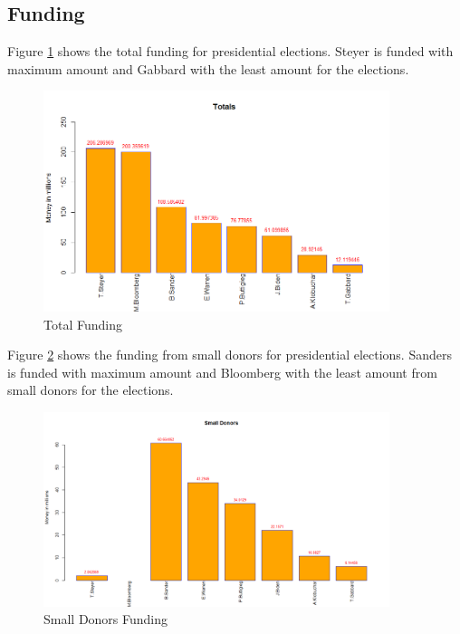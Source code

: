 \subsection{Funding}
Figure \ref{Total} shows the total funding for presidential elections. Steyer is funded with maximum amount and Gabbard with the least amount for the elections. 
\begin{figure}[H]
    \centering
    \includegraphics[width=0.9\textwidth]{figures/Total.png}
    \caption{Total Funding}
    \label{Total}
\end{figure}

Figure \ref{Small Donors} shows the funding from small donors for presidential elections. Sanders is funded with maximum amount and Bloomberg with the least amount from small donors for the elections. 
\begin{figure}[H]
    \centering
    \includegraphics[width=0.9\textwidth]{figures/Small Donors.png}
    \caption{Small Donors Funding}
    \label{Small Donors}
\end{figure}

